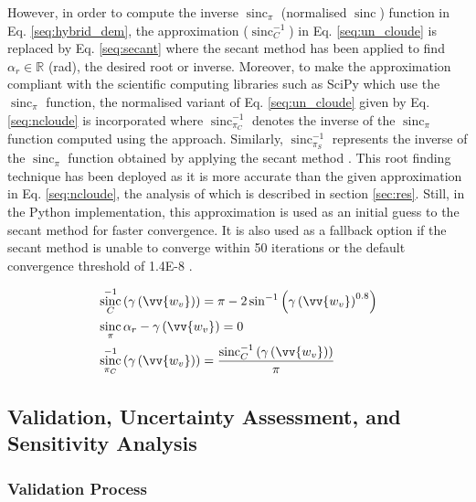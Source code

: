 \documentclass[review]{elsarticle}
\numberwithin{equation}{section}
\numberwithin{figure}{section}
\numberwithin{table}{section}
\DeclareMathOperator{\sinc}{sinc}
\begin{document}
However, in order to compute the inverse $\sinc_\pi$ (normalised $\sinc$) function in Eq. \eqref{seq:hybrid_dem}, the \cite{Cloude2010} approximation ($\sinc_C^{-1}$) in Eq. \eqref{seq:un_cloude} is replaced by Eq. \eqref{seq:secant} where the secant method \citep{Cheney2012} has been applied to find $\alpha_r \in \mathbb{R}$ (rad), the desired root or inverse. Moreover, to make the \cite{Cloude2010} approximation compliant with the scientific computing libraries such as SciPy \citep{Jones2001} which use the $\sinc_\pi$ function, the normalised variant of Eq. \eqref{seq:un_cloude} given by Eq. \eqref{seq:ncloude} is incorporated where $\sinc_{\pi_C}^{-1}$ denotes the inverse of the $\sinc_\pi$ function computed using the \cite{Cloude2010} approach. Similarly, $\sinc_{\pi_S}^{-1}$ represents the inverse of the $\sinc_\pi$ function obtained by applying the secant method \citep{Cheney2012, Jones2001}. This root finding technique has been deployed as it is more accurate than the given approximation in Eq. \eqref{seq:ncloude}, the analysis of which is described in section \ref{sec:res}. Still, in the Python implementation, this approximation is used as an initial guess to the secant method for faster convergence. It is also used as a fallback option if the secant method is unable to converge within 50 iterations or the default convergence threshold of 1.4E-8 \citep{Jones2001}.

\begin{subequations}
    \centering
    \begin{align}
        \label{seq:un_cloude}
        & \sinc_C^{-1}\left(\gamma\left(\vv{w_v}\right)\right) = \pi - 2\sin^{-1}\left(\gamma\left(\vv{w_v}\right)^{0.8}\right) \\
        \label{seq:secant}
        & \sinc_\pi\alpha_r  - \gamma\left(\vv{w_v}\right) = 0 \\
        \label{seq:ncloude}
        & \sinc_{\pi_C}^{-1}\left(\gamma\left(\vv{w_v}\right)\right) = \frac{\sinc_C^{-1}\left(\gamma\left(\vv{w_v}\right)\right)}{\pi}
    \end{align}
\end{subequations}

\subsection{Validation, Uncertainty Assessment, and Sensitivity Analysis}
\label{ssec:vus}
\subsubsection{Validation Process}
\label{sssec:val}
\end{document}
